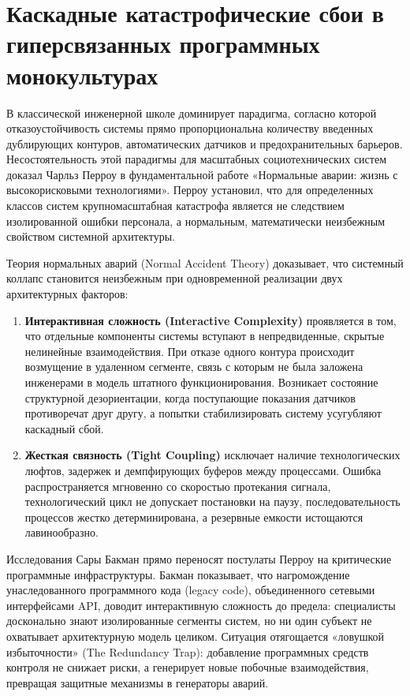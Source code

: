 \documentclass[12pt,a4paper]{article}
\begin{document}
\section{Каскадные катастрофические сбои в гиперсвязанных программных монокультурах}

В классической инженерной школе доминирует парадигма, согласно 
которой отказоустойчивость системы прямо пропорциональна количеству 
введенных дублирующих контуров, автоматических датчиков и 
предохранительных барьеров. Несостоятельность этой парадигмы для 
масштабных социотехнических систем доказал Чарльз Перроу в 
фундаментальной работе «Нормальные аварии: жизнь с высокорисковыми 
технологиями». Перроу установил, что для определенных классов систем 
крупномасштабная катастрофа является не следствием изолированной ошибки 
персонала, а нормальным, математически неизбежным свойством системной 
архитектуры.

Теория нормальных аварий (Normal Accident Theory) доказывает, что системный коллапс становится неизбежным при одновременной реализации двух архитектурных факторов:
\begin{enumerate}[leftmargin=2em, itemsep=0.2em]
    \item \textbf{Интерактивная сложность (Interactive Complexity)} 
    проявляется в том, что отдельные компоненты системы вступают в 
    непредвиденные, скрытые нелинейные взаимодействия. При отказе 
    одного контура происходит возмущение в удаленном сегменте, связь 
    с которым не была заложена инженерами в модель штатного 
    функционирования. Возникает состояние структурной дезориентации, 
    когда поступающие показания датчиков противоречат друг другу, а 
    попытки стабилизировать систему усугубляют каскадный сбой.
    \item \textbf{Жесткая связность (Tight Coupling)} исключает наличие 
    технологических люфтов, задержек и демпфирующих буферов между 
    процессами. Ошибка распространяется мгновенно со скоростью 
    протекания сигнала, технологический цикл не допускает постановки 
    на паузу, последовательность процессов жестко детерминирована, а 
    резервные емкости истощаются лавинообразно.
\end{enumerate}

Исследования Сары Бакман прямо переносят постулаты Перроу на критические программные инфраструктуры. Бакман показывает, что нагромождение унаследованного программного кода (legacy code), объединенного сетевыми интерфейсами API, доводит интерактивную сложность до предела: специалисты досконально знают изолированные сегменты систем, но ни один субъект не охватывает архитектурную модель целиком. Ситуация отягощается «ловушкой избыточности» (The Redundancy Trap): добавление программных средств контроля не снижает риски, а генерирует новые побочные взаимодействия, превращая защитные механизмы в генераторы аварий.
\end{document}
